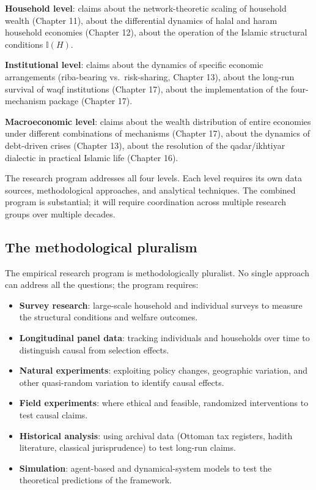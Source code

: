 \textbf{Household level}: claims about the network-theoretic
scaling of household wealth (Chapter 11), about the differential
dynamics of halal and haram household economies (Chapter 12),
about the operation of the Islamic structural conditions
$\mathbb{I}(H)$.

\textbf{Institutional level}: claims about the dynamics of
specific economic arrangements (riba-bearing vs.\ risk-sharing,
Chapter 13), about the long-run survival of waqf institutions
(Chapter 17), about the implementation of the four-mechanism
package (Chapter 17).

\textbf{Macroeconomic level}: claims about the wealth distribution
of entire economies under different combinations of mechanisms
(Chapter 17), about the dynamics of debt-driven crises (Chapter
13), about the resolution of the qadar/ikhtiyar dialectic in
practical Islamic life (Chapter 16).

The research program addresses all four levels. Each level
requires its own data sources, methodological approaches, and
analytical techniques. The combined program is substantial; it
will require coordination across multiple research groups over
multiple decades.

\subsection{The methodological pluralism}

The empirical research program is methodologically pluralist. No
single approach can address all the questions; the program
requires:

\begin{itemize}[leftmargin=2em]
    \item \textbf{Survey research}: large-scale household and
    individual surveys to measure the structural conditions and
    welfare outcomes.
    \item \textbf{Longitudinal panel data}: tracking individuals
    and households over time to distinguish causal from selection
    effects.
    \item \textbf{Natural experiments}: exploiting policy changes,
    geographic variation, and other quasi-random variation to
    identify causal effects.
    \item \textbf{Field experiments}: where ethical and feasible,
    randomized interventions to test causal claims.
    \item \textbf{Historical analysis}: using archival data
    (Ottoman tax registers, hadith literature, classical
    jurisprudence) to test long-run claims.
    \item \textbf{Simulation}: agent-based and dynamical-system
    models to test the theoretical predictions of the framework.
\end{itemize}

